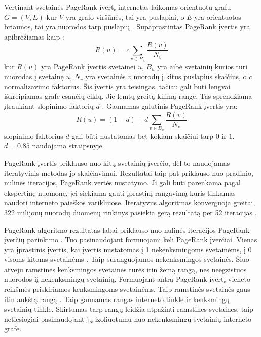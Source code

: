 Vertinant svetainės PageRank įvertį internetas laikomas orientuotu grafu $G = (V, E)$ kur $V$ yra grafo viršūnės, tai yra puslapiai, o $E$ yra orientuotos briaunos, tai yra nuorodos tarp puslapių \cite{Wu2008}. Supaprastintas PageRank įvertis yra apibrėžiamas kaip \cite{pagerank}:
\begin{equation}
    R(u) = c \sum_{v \in B_u} \frac{R(v)}{N_v}
\end{equation}
kur $R(u)$ yra PageRank įvertis svetainei $u$, $B_u$ yra aibė svetainių kurios turi nuorodas į svetainę $u$, $N_v$ yra svetainės $v$ nuorodų į kitus puslapius skaičius, o $c$ normalizavimo faktorius. Šis įvertis yra teisingas, tačiau gali būti lengvai iškreipiamas grafe esančių ciklų. Jie lemtų greitą kilimą range. Tas sprendžiama įtraukiant slopinimo faktorių $d$ \cite{pagerank}. Gaunamas galutinis PageRank įvertis yra:
\begin{equation}
    R(u) = (1 - d) + d \sum_{v \in B_u} \frac{R(v)}{N_v}
\end{equation}
slopinimo faktorius $d$ gali būti nustatomas bet kokiam skaičiui tarp $0$ ir $1$. $d=0.85$ naudojama straipsnyje \cite{pagerank}

 PageRank įvertis priklauso nuo kitų svetainių įverčio, dėl to naudojamas iteratyvinis metodas jo skaičiavimui. Rezultatai taip pat priklauso nuo pradinio, nulinės iteracijos, PageRank vertės nustatymo. Ji gali būti parenkama pagal ekspertinę nuomonę, jei siekiama gauti įprastinį rangavimą kuris tinkamas naudoti interneto paieškos varikliuose.  Iteratyvus algoritmas konverguoja greitai, 322 milijonų nuorodų duomenų rinkinys pasiekia gerą rezultatą per 52 iteracijas \cite{pagerank}.

 PageRank algoritmo rezultatas labai priklauso nuo nulinės iteracijos PageRank įverčių parinkimo \cite{linchpins}. Tuo pasinaudojant formuojami keli PageRank įverčiai. Vienas yra įprastinis įvertis, kai įvertis nustatomas į 1 nekenksmingoms svetainėms, į 0 visoms kitoms svetainėms \cite{linchpins}. Taip suranguojamos nekenksmingos svetainės. Šiuo atveju ramstinės kenksmingos svetainės turės itin žemą rangą, nes neegzistuos nuorodos iį nekenksmingų svetainių. Formuojant antrą PageRank įvertį vieneto reikšmės priskiriamos kenksmingoms svetainėms. Taip ramstinės svetainės gaus itin aukštą rangą \cite{linchpins}. Taip gaunamas rangas interneto tinkle ir kenksmingų svetainių tinkle. Skirtumas tarp rangų leidžia atpažinti ramstines svetaines, taip netiesiogiai pasinaudojant jų izoliuotumu nuo nekenksmingų svetainių interneto grafe.

